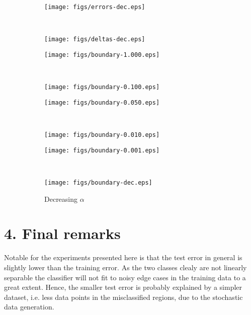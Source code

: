 \documentclass{article}
\begin{document}
\begin{figure}[ht]
    \centering
    \begin{subfigure}{0.48\textwidth}
        \centering
        \texttt{[image: figs/errors-dec.eps]}
        \caption{}
    \end{subfigure}
    ~
    \centering
    \begin{subfigure}{0.48\textwidth}
        \centering
        \texttt{[image: figs/deltas-dec.eps]}
        \caption{}
    \end{subfigure}
    \caption{}
\end{figure}

\begin{figure}[ht]
    \centering
    \begin{subfigure}{0.48\textwidth}
        \centering
        \texttt{[image: figs/boundary-1.000.eps]}
        \caption{}
    \end{subfigure}
    ~
    \begin{subfigure}{0.48\textwidth}
        \centering
        \texttt{[image: figs/boundary-0.100.eps]}
        \caption{}
    \end{subfigure}
    
    \begin{subfigure}{0.48\textwidth}
        \centering
        \texttt{[image: figs/boundary-0.050.eps]}
        \caption{}
    \end{subfigure}
    ~
    \begin{subfigure}{0.48\textwidth}
        \centering
        \texttt{[image: figs/boundary-0.010.eps]}
        \caption{}
    \end{subfigure}
   
    \begin{subfigure}{0.48\textwidth}
        \centering
        \texttt{[image: figs/boundary-0.001.eps]}
        \caption{}
    \end{subfigure}
    ~
    \begin{subfigure}{0.48\textwidth}
        \centering
        \texttt{[image: figs/boundary-dec.eps]}
        \caption{Decreasing $\alpha$}
    \end{subfigure}
    \caption{}
    \label{fig:boundary}
\end{figure}

\section*{4. Final remarks}
Notable for the experiments presented here is that the test error in general is slightly lower than the training error. As the two classes clealy are not linearly separable the classifier will not fit to noisy edge cases in the training data to a great extent. Hence, the smaller test error is probably explained by a simpler dataset, i.e. less data points in the misclassified regions, due to the stochastic data generation.
\end{document}
